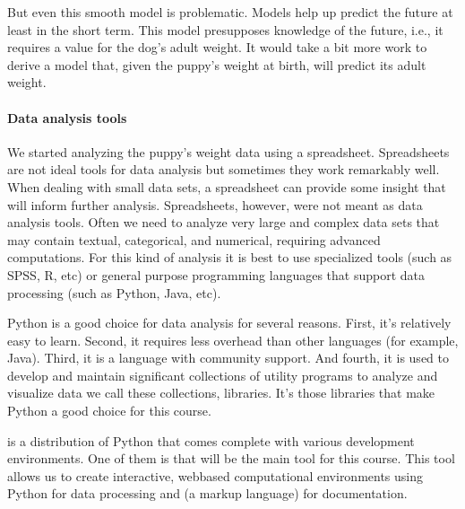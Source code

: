 \documentclass[letterpaper,10pt,english]{sphinxmanual}
\begin{document}
But even this smooth model is problematic. Models help up predict the future \textendash{} at least in the short term. This model presupposes knowledge of the future, i.e., it requires a value for the dog’s adult weight. It would take a bit more work to derive a model that, given the puppy’s weight at birth, will predict its adult weight.


\paragraph{Data analysis tools}
\label{\detokenize{COMP180/2020Spring/week2:data-analysis-tools}}
We started analyzing the puppy’s weight data using a spreadsheet. Spreadsheets are not ideal tools for data analysis but sometimes they work remarkably well. When dealing with small data sets, a spreadsheet can provide some insight that will inform further analysis. Spreadsheets, however, were not meant as data analysis tools. Often we need to analyze very large and complex data sets that may contain textual, categorical, and numerical, requiring advanced computations. For this kind of analysis it is best to use specialized tools (such as SPSS, R, etc) or general purpose programming languages that support data processing (such as Python, Java, etc).

Python is a good choice for data analysis for several reasons. First, it’s relatively easy to learn. Second, it requires less overhead than other languages (for example, Java). Third, it is a language with  community support. And fourth, it is used to develop and maintain significant collections of utility programs to analyze and visualize data \textendash{} we call these collections, libraries. It’s those libraries that make Python a good choice for this course.

 is a distribution of Python that comes complete with various development environments. One of them is  that will be the main tool for this course. This tool allows us to create interactive, web\sphinxhyphen{}based computational environments using Python for data processing and  (a markup language) for documentation.
\end{document}

